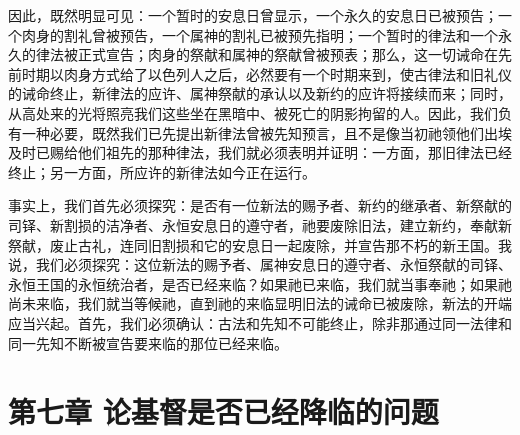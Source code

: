 因此，既然明显可见：一个暂时的安息日曾显示，一个永久的安息日已被预告；一个肉身的割礼曾被预告，一个属神的割礼已被预先指明；一个暂时的律法和一个永久的律法被正式宣告；肉身的祭献和属神的祭献曾被预表；那么，这一切诫命在先前时期以肉身方式给了以色列人之后，必然要有一个时期来到，使古律法和旧礼仪的诫命终止，新律法的应许、属神祭献的承认以及新约的应许将接续而来；同时，从高处来的光将照亮我们这些坐在黑暗中、被死亡的阴影拘留的人。因此，我们负有一种必要，既然我们已先提出新律法曾被先知预言，且不是像当初祂领他们出埃及时已赐给他们祖先的那种律法，我们就必须表明并证明：一方面，那旧律法已经终止；另一方面，所应许的新律法如今正在运行。\par

事实上，我们首先必须探究：是否有一位新法的赐予者、新约的继承者、新祭献的司铎、新割损的洁净者、永恒安息日的遵守者，祂要废除旧法，建立新约，奉献新祭献，废止古礼，连同旧割损和它的安息日一起废除，并宣告那不朽的新王国。我说，我们必须探究：这位新法的赐予者、属神安息日的遵守者、永恒祭献的司铎、永恒王国的永恒统治者，是否已经来临？如果祂已来临，我们就当事奉祂；如果祂尚未来临，我们就当等候祂，直到祂的来临显明旧法的诫命已被废除，新法的开端应当兴起。首先，我们必须确认：古法和先知不可能终止，除非那通过同一法律和同一先知不断被宣告要来临的那位已经来临。\par


\section{第七章 论基督是否已经降临的问题}

